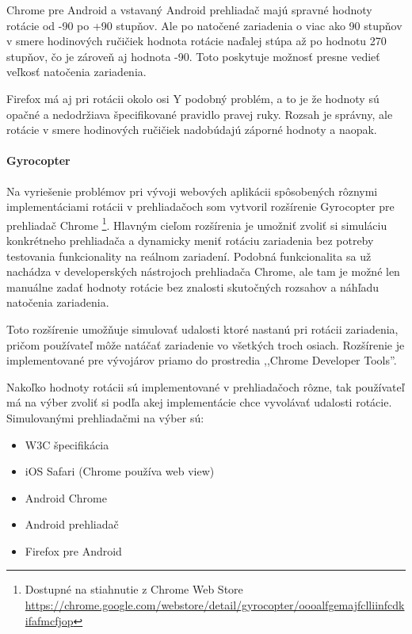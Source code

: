 Chrome pre Android a vstavaný Android prehliadač majú spravné hodnoty rotácie od -90 po +90 stupňov. Ale po natočené zariadenia o viac ako 90 stupňov v smere hodinových ručičiek hodnota rotácie naďalej stúpa až po hodnotu 270 stupňov, čo je zároveň aj hodnota -90. Toto poskytuje možnosť presne vedieť veľkosť natočenia zariadenia.

Firefox má aj pri rotácii okolo osi Y podobný problém, a to je že hodnoty sú opačné a nedodržiava špecifikované pravidlo pravej ruky. Rozsah je správny, ale rotácie v smere hodinových ručičiek nadobúdajú záporné hodnoty a naopak.



\paragraph{Gyrocopter} %
\label{par:gyrocopter}

Na vyriešenie problémov pri vývoji webových aplikácii spôsobených rôznymi implementáciami rotácii v prehliadačoch som vytvoril rozšírenie Gyrocopter pre prehliadač Chrome \footnote{Dostupné na stiahnutie z Chrome Web Store \url{https://chrome.google.com/webstore/detail/gyrocopter/oooalfgemajfclliinfcdkifafmcfjop}}. Hlavným cieľom rozšírenia je umožniť zvoliť si simuláciu konkrétneho prehliadača a dynamicky meniť rotáciu zariadenia bez potreby testovania funkcionality na reálnom zariadení. Podobná funkcionalita sa už nachádza v developerských nástrojoch prehliadača Chrome, ale tam je možné len manuálne zadať hodnoty rotácie bez znalosti skutočných rozsahov a náhľadu natočenia zariadenia.

Toto rozšírenie umožňuje simulovať udalosti ktoré nastanú pri rotácii zariadenia, pričom používateľ môže natáčať zariadenie vo všetkých troch osiach. Rozšírenie je implementované pre vývojárov priamo do prostredia ,,Chrome Developer Tools''.

Nakoľko hodnoty rotácii sú implementované v prehliadačoch rôzne, tak používateľ má na výber zvoliť si podľa akej implementácie chce vyvolávať udalosti rotácie. Simulovanými prehliadačmi na výber sú:

\begin{itemize}
  \item W3C špecifikácia
  \item iOS Safari (Chrome používa web view)
  \item Android Chrome
  \item Android prehliadač
  \item Firefox pre Android
\end{itemize}

